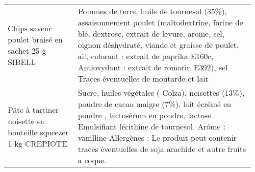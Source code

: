 \begin{longtable}{p{5cm}p{10cm}}
                                                         Chips saveur poulet braisé en sachet 25 g SIBELL &                                                                                                                                                                                                                                                                                                                                                                                                                                                                                                                                                                                                                                                                                                                   Pommes de terre, huile de tournesol (35\%), assaisonnement poulet (maltodextrine, farine de blé, dextrose, extrait de levure, arome, sel, oignon déshydraté, viande et graisse de poulet, ail, colorant : extrait de paprika E160c, Antioxydant : extrait de romarin E392), sel  Traces éventuelles de moutarde et lait \\
                                             Pâte à tartiner noisette en bouteille squeezer 1 kg CREPIOTE &                                                                                                                                                                                                                                                                                                                                                                                                                                                                                                                                                                                                                                                                                                                                         Sucre, huiles végétales ( Colza), noisettes (13\%), poudre de cacao maigre (7\%), lait écrémé en poudre , lactosérum en poudre, lactose. Emulsifiant lécithine de tournesol. Arôme : vanilline  Allergènes : Le produit peut contenir traces éventuelles de soja arachide et autre fruits a coque. \\

\end{longtable}
